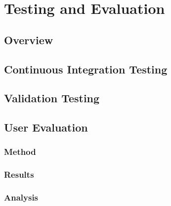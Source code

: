 
\chapter[Testing and Evaluation]{Testing and Evaluation} %

\label{Chapter10} %


\section{Overview}



\section{Continuous Integration Testing}



\section{Validation Testing}



\section{User Evaluation}

\subsection{Method}
\subsection{Results}
\subsection{Analysis}

